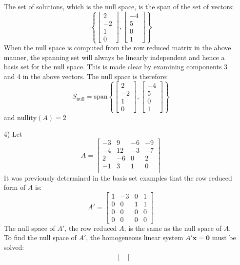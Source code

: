 \documentclass{article}
\begin{document}
\begin{itemize}
The set of solutions, which is the null space, is the span of the set of vectors:
\[\left\{\begin{bmatrix} 2 \\ -2 \\ 1 \\ 0 \end{bmatrix}, \begin{bmatrix} -4 \\ 5 \\ 0 \\ 1 \end{bmatrix}\right\}\]
When the null space is computed from the row reduced matrix in the above manner, the spanning set will always be linearly independent and hence a basis set for the null space. This is made clear by examining components 3 and 4 in the above vectors. The null space is therefore:
\[S_{\text{null}} = \text{span}\left\{\begin{bmatrix} 2 \\ -2 \\ 1 \\ 0 \end{bmatrix}, \begin{bmatrix} -4 \\ 5 \\ 0 \\ 1 \end{bmatrix}\right\}\]
and \(\text{nullity}(A) = 2\)
\item[4)] Let \[A = \begin{bmatrix}
-3 &   9 & -6 & -9 \\
-4 & 12 & -3 & -7 \\
 2 &  -6 &  0 &  2 \\ 
-1 &   3 &  1 &  0 \\
\end{bmatrix}\]
It was previously determined in the basis set examples that the row reduced form of \(A\) is: 
\[A' = \begin{bmatrix}
1 & -3 & 0 & 1 \\
0 &  0 & 1 & 1 \\
0 &  0 & 0 & 0 \\ 
0 &  0 & 0 & 0
\end{bmatrix}\]
The null space of \(A'\), the row reduced \(A\), is the same as the null space of \(A\). To find the null space of \(A'\), the homogeneous linear system \(A'\mathbf{x} = \mathbf{0}\) must be solved:
\begin{align*}
& \begin{bmatrix}

\end{bmatrix}
\end{align*}
\end{itemize}
\end{document}

